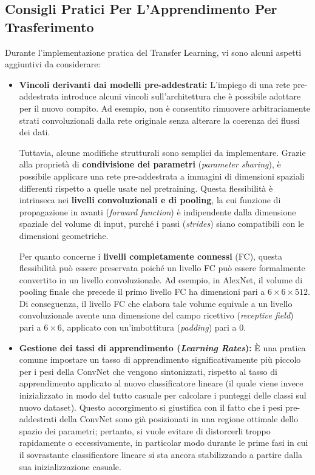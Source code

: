 ﻿\documentclass[11pt, a4paper]{article}
\begin{document}
\newpage

\subsection{Consigli Pratici Per L'Apprendimento Per Trasferimento}
Durante l'implementazione pratica del Transfer Learning, vi sono alcuni aspetti aggiuntivi da considerare:

\begin{itemize}
    \item \textbf{Vincoli derivanti dai modelli pre-addestrati:}
    L'impiego di una rete pre-addestrata introduce alcuni vincoli sull'architettura che è possibile adottare per il nuovo compito. Ad esempio, non è consentito rimuovere arbitrariamente strati convoluzionali dalla rete originale senza alterare la coerenza dei flussi dei dati.

    Tuttavia, alcune modifiche strutturali sono semplici da implementare. Grazie alla proprietà di \textbf{condivisione dei parametri} (\emph{parameter sharing}), è possibile applicare una rete pre-addestrata a immagini di dimensioni spaziali differenti rispetto a quelle usate nel pretraining. Questa flessibilità è intrinseca nei \textbf{livelli convoluzionali e di pooling}, la cui funzione di propagazione in avanti (\emph{forward function}) è indipendente dalla dimensione spaziale del volume di input, purché i passi (\emph{strides}) siano compatibili con le dimensioni geometriche.

    Per quanto concerne i \textbf{livelli completamente connessi} (FC), questa flessibilità può essere preservata poiché un livello FC può essere formalmente convertito in un livello convoluzionale. Ad esempio, in AlexNet, il volume di pooling finale che precede il primo livello FC ha dimensioni pari a $6 \times 6 \times 512$. Di conseguenza, il livello FC che elabora tale volume equivale a un livello convoluzionale avente una dimensione del campo ricettivo (\emph{receptive field}) pari a $6 \times 6$, applicato con un'imbottitura (\emph{padding}) pari a $0$.

    \item \textbf{Gestione dei tassi di apprendimento (\emph{Learning Rates}):}
    È una pratica comune impostare un tasso di apprendimento significativamente più piccolo per i pesi della ConvNet che vengono sintonizzati, rispetto al tasso di apprendimento applicato al nuovo classificatore lineare (il quale viene invece inizializzato in modo del tutto casuale per calcolare i punteggi delle classi sul nuovo dataset). Questo accorgimento si giustifica con il fatto che i pesi pre-addestrati della ConvNet sono già posizionati in una regione ottimale dello spazio dei parametri; pertanto, si vuole evitare di distorcerli troppo rapidamente o eccessivamente, in particolar modo durante le prime fasi in cui il sovrastante classificatore lineare si sta ancora stabilizzando a partire dalla sua inizializzazione casuale.
\end{itemize}
\end{document}
